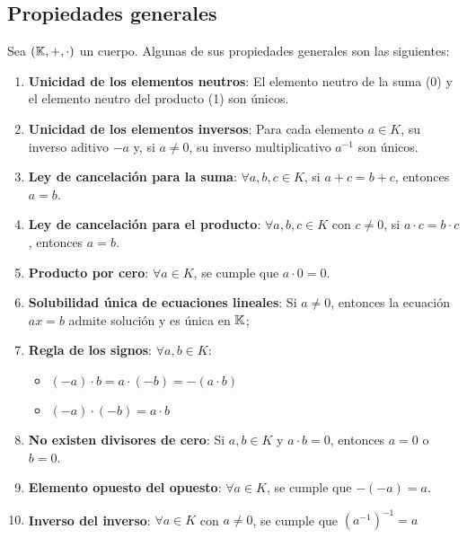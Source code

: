 
	
\subsection{Propiedades generales}

Sea $(\mathbb{K}, +, \cdot)$ un cuerpo. Algunas de sus propiedades generales son las siguientes:

\begin{enumerate}
	\item \textbf{Unicidad de los elementos neutros}: El elemento neutro de la suma (0) y el elemento neutro del producto (1) son únicos.
	
	\item \textbf{Unicidad de los elementos inversos}: Para cada elemento $a \in K$, su inverso aditivo $-a$ y, si $a \neq 0$, su inverso multiplicativo $a^{-1}$ son únicos.
	
	\item \textbf{Ley de cancelación para la suma}: $\forall a, b, c \in K$, si $a + c = b + c$, entonces $a = b$.
	
	\item \textbf{Ley de cancelación para el producto}: $\forall a, b, c \in K$ con $c \neq 0$, si $a \cdot c = b \cdot c$, entonces $a = b$.
	
	\item \textbf{Producto por cero}: $ \forall a \in K$, se cumple que $a \cdot 0 = 0$.
	
	\item \textbf{Solubilidad única de ecuaciones lineales}: Si $a\ne 0$, entonces la ecuación $ax = b$ admite solución y es única en $\mathbb{K}$;
	
	\item \textbf{Regla de los signos}:
	 $\forall a, b \in K$:
	 \begin{itemize}
	 	\item $(-a) \cdot b = a \cdot (-b) = -(a \cdot b)$
	 	\item $(-a) \cdot (-b) = a \cdot b$
	 \end{itemize}
	
	\item \textbf{No existen divisores de cero}: Si $a, b \in K$ y $a \cdot b = 0$, entonces $a = 0$ o $b = 0$.
	
	\item \textbf{Elemento opuesto del opuesto}: $\forall a \in K$, se cumple que $-(-a) = a$.
	
	\item \textbf{Inverso del inverso}: $\forall a \in K$ con $a \neq 0$, se cumple que $(a^{-1})^{-1} = a$
\end{enumerate}

